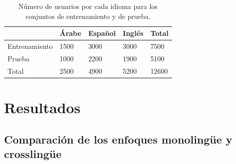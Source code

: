 \documentclass[runningheads]{llncs}
\begin{document}
\begin{table}[]
\caption{Número de usuarios por cada idioma para los conjuntos de entrenamiento y de prueba.}\label{table-datasets}
\centering
\begin{tabular}{|l|l|l|l|l|}
\hline
              & Árabe & Español & Inglés & Total \\ \hline
Entrenamiento & 1500  & 3000    & 3000   & 7500  \\ \hline
Prueba        & 1000  & 2200    & 1900   & 5100  \\ \hline
Total         & 2500  & 4900    & 5200   & 12600 \\ \hline
\end{tabular}
\end{table}

\section{Resultados}


\subsection{Comparación de los enfoques monolingüe y crosslingüe}
\end{document}
